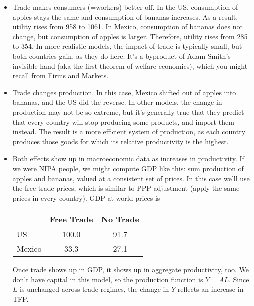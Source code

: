 \documentclass[letterpaper,12pt]{article}
\begin{document}
\begin{itemize}

\item Trade makes consumers (=workers) better off.
In the US, consumption of apples stays the same and consumption of
bananas increases. As a result, utility rises from 958 to 1061. In
Mexico, consumption of bananas does not change, but consumption of
apples is larger. Therefore, utility rises from 285 to 354. In
more realistic models, the impact of trade is typically small,
but both countries gain, as they do here.
It's a byproduct of Adam Smith's invisible hand (aka the first
theorem of welfare economics), which you might recall from Firms
and Markets.

\item Trade changes production.  In this
case, Mexico shifted out of apples into bananas, and the US did the reverse.
In other models, the change in production may not be
so extreme, but it's generally true that they predict that every
country will stop producing some products, and import them
instead.  The result is a more efficient system of production,
as each country produces those goods for which its relative
productivity is the highest.

\item Both effects show up in macroeconomic data as increases in
productivity.  If we were NIPA people, we might compute GDP
like this:  sum production of apples and bananas, valued at a
consistent set of prices.  In this case we'll use the free trade
prices, which is similar to PPP adjustment (apply the
same prices in every country).  GDP at world prices is
%
%
\begin{center}

\begin{tabular}{||l|c|c||}
\hline\hline%
                    &      Free Trade     &    No Trade    \\%

\hline\hline%
US                  &         100.0       &      91.7      \\%
\hline%
Mexico              &          33.3       &      27.1      \\%
\hline\hline%
\end{tabular}


\end{center}
%
%
Once trade shows up in GDP, it shows up in aggregate
productivity, too.  We don't have capital in this model, so the
production function is $Y = AL$.  Since $L$ is unchanged across
trade regimes, the change in $Y$ reflects an increase in TFP.


\end{itemize}
\end{document}
